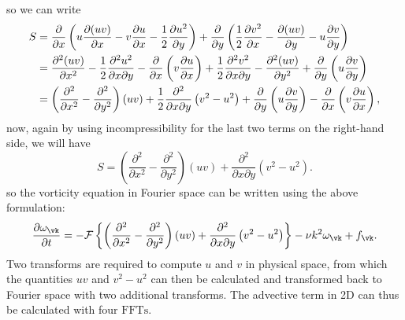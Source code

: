 \documentclass[12pt]{article}
\begin{document}
so we can write
\begin{align}\label{Eq-19}
S &= \dfrac{\partial}{\partial x} \left(u\dfrac{\partial (uv)}{\partial x}-v\dfrac{\partial u}{\partial x}-\dfrac{1}{2}\dfrac{\partial u^2}{\partial y}\right)+\dfrac{\partial}{\partial y} \left(\dfrac{1}{2}\dfrac{\partial v^2}{\partial x}- \dfrac{\partial (uv)}{\partial y}-u\dfrac{\partial v}{\partial y}\right) 							  		\notag \\
&= \dfrac{\partial^2 (uv)}{\partial x^2}-\dfrac{1}{2}\dfrac{\partial^2 u^2}{\partial x \partial y}-\dfrac{\partial }{\partial x}\left(v\dfrac{\partial u}{\partial x}\right)+\dfrac{1}{2}\dfrac{\partial^2 v^2}{\partial x \partial y}-\dfrac{\partial^2 (uv)}{\partial y^2}+\dfrac{\partial }{\partial y}\left(u\dfrac{\partial v}{\partial y}\right) 		\notag \\
&= \left(\dfrac{\partial^2}{\partial x^2}-\dfrac{\partial^2}{\partial y^2}\right)(uv)+\dfrac{1}{2}\dfrac{\partial^2}{\partial x \partial y}\left(v^2 - u^2 \right)+\dfrac{\partial }{\partial y}\left(u\dfrac{\partial v}{\partial y}\right)-\dfrac{\partial }{\partial x}\left(v\dfrac{\partial u}{\partial x}\right),
\end{align}
now, again by using incompressibility for the last two terms on the right-hand side, we will have
\begin{equation}\label{Eq-20}
S =\left(\dfrac{\partial^2}{\partial x^2}-\dfrac{\partial^2}{\partial y^2}\right)(uv)+\dfrac{\partial^2}{\partial x \partial y}\left(v^2 - u^2 \right).
\end{equation}
so the vorticity equation in Fourier space can be written using the above formulation:
\begin{equation}\label{Eq-21}
\frac{\partial\omega_{\vk}}{\partial t} =- \mathcal{F}\left\lbrace\left(\dfrac{\partial^2}{\partial x^2}-\dfrac{\partial^2}{\partial y^2}\right)(uv)+\dfrac{\partial^2}{\partial x \partial y}\left(v^2 - u^2 \right)\right\rbrace-\nu k^2\omega_{\vk} + f_{\vk}.
\end{equation}
Two transforms are required to compute $u$ and $v$ in physical space,
from which the quantities $uv$ and $v^2-u^2$ can then be calculated and 
transformed back to Fourier space with two additional transforms.
The advective term in 2D can thus be calculated with four $\text{FFTs}$.

\hypertarget{Bibliography}{}


\hypertarget{Index}{}
\printindex
\end{document}
